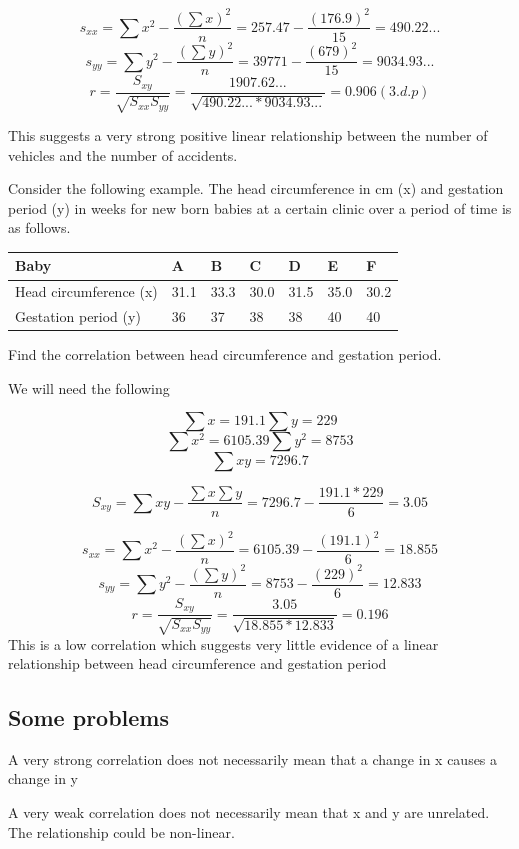 \documentclass[
  letterpaper,
  DIV=11,
  numbers=noendperiod]{scrartcl}
\begin{document}
\[ s_{xx} = \sum x^2 - \frac{(\sum x)^2}{n} = 257.47 - \frac{(176.9)^2}{15} = 490.22... \]
\[ s_{yy} = \sum y^2 - \frac{(\sum y)^2}{n} = 39771 - \frac{(679)^2}{15} = 9034.93... \]
\[ r = \frac{S_{xy}}{\sqrt{S_{xx}S_{yy}}} = \frac{1907.62...}{\sqrt{490.22...*9034.93...}} = 0.906(3.d.p)\]

This suggests a very strong positive linear relationship between the
number of vehicles and the number of accidents.

Consider the following example. The head circumference in cm (x) and
gestation period (y) in weeks for new born babies at a certain clinic
over a period of time is as follows.

\begin{longtable}[]{@{}lllllll@{}}
\toprule\noalign{}
Baby & A & B & C & D & E & F \\
\midrule\noalign{}
\endhead
\bottomrule\noalign{}
\endlastfoot
Head circumference (x) & 31.1 & 33.3 & 30.0 & 31.5 & 35.0 & 30.2 \\
Gestation period (y) & 36 & 37 & 38 & 38 & 40 & 40 \\
\end{longtable}

Find the correlation between head circumference and gestation period.

We will need the following

\[ \sum x = 191.1  \sum y = 229 \]
\[ \sum x^2 = 6105.39  \sum y^2 = 8753 \] \[ \sum xy = 7296.7 \]

\[ S_{xy}  = \sum xy - \frac{\sum x \sum y}{n} = 7296.7 - \frac{191.1 * 229}{6} = 3.05 \]

\[ s_{xx} = \sum x^2 - \frac{(\sum x)^2}{n} = 6105.39 - \frac{(191.1)^2}{6} = 18.855 \]
\[ s_{yy} = \sum y^2 - \frac{(\sum y)^2}{n} = 8753 - \frac{(229)^2}{6} = 12.833 \]
\[ r = \frac{S_{xy}}{\sqrt{S_{xx}S_{yy}}} = \frac{3.05}{\sqrt{18.855*12.833}} = 0.196\]
This is a low correlation which suggests very little evidence of a
linear relationship between head circumference and gestation period

\subsection{Some problems}\label{some-problems}

A very strong correlation does not necessarily mean that a change in x
causes a change in y

A very weak correlation does not necessarily mean that x and y are
unrelated. The relationship could be non-linear.
\end{document}

